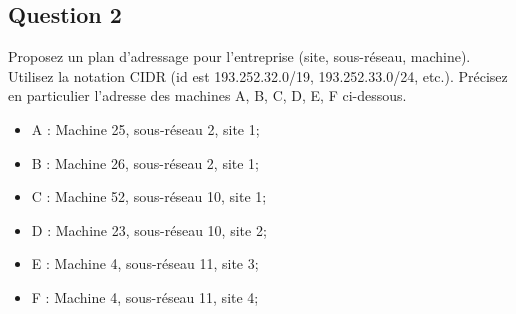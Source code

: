 \documentclass{article}
\begin{document}
\subsection*{Question 2}
\begin{exercise}
    Proposez un plan d'adressage pour l'entreprise (site, sous-réseau, machine). Utilisez la notation CIDR (id est 193.252.32.0/19, 193.252.33.0/24, etc.). Précisez en particulier l'adresse des machines A, B, C, D, E, F ci-dessous.
\begin{itemize}[noitemsep]
    \item A : Machine 25, sous-réseau 2, site 1;
    \item B : Machine 26, sous-réseau 2, site 1;
    \item C : Machine 52, sous-réseau 10, site 1;
    \item D : Machine 23, sous-réseau 10, site 2;
    \item E : Machine 4, sous-réseau 11, site 3;
    \item F : Machine 4, sous-réseau 11, site 4;
\end{itemize}
\end{exercise}
\end{document}

